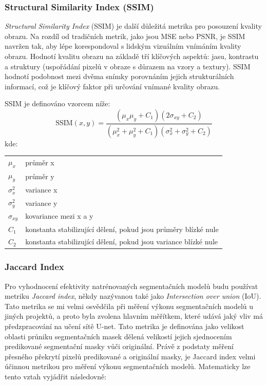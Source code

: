\documentclass[male,czech,api_ing]{thesis}
\makeatletter
\newenvironment{conditions}[1][kde:]
    {#1 \begin{tabular}[t]{>{$}l<{$} @{${}={}$} >{\raggedright\arraybackslash}p{10cm}}}
    {\end{tabular}}
\makeatother
\begin{document}
\subsubsection{Structural Similarity Index (SSIM)}
\textit{Structural Similarity Index} (SSIM) je další důležitá metrika pro posouzení kvality obrazu. Na rozdíl od tradičních metrik, jako jsou MSE nebo PSNR, je SSIM navržen tak, aby lépe korespondoval s lidským vizuálním vnímáním kvality obrazu. Hodnotí kvalitu obrazu na základě tří klíčových aspektů: jasu, kontrastu a struktury (uspořádání pixelů v obraze s důrazem na vzory a textury). SSIM hodnotí podobnost mezi dvěma snímky porovnáním jejich strukturálních informací, což je klíčový faktor při určování vnímané kvality obrazu. \cite{PSNRSSIM}

SSIM je definováno vzorcem níže:
\begin{equation}
    \text{SSIM}(x, y) = \frac{(\mu_x \mu_y + C_1)(2\sigma_{xy} + C_2)}{(\mu_x^2 + \mu_y^2 + C_1)(\sigma_x^2 + \sigma_y^2 + C_2)}
\end{equation}
\begin{conditions}
    \mu_x & průměr x \\
    \mu_y & průměr y \\
    \sigma_x^2 & variance x \\
    \sigma_y^2 & variance y \\
    \sigma_{xy} & kovariance mezi x a y \\
    C_1 & konstanta stabilizující dělení, pokud jsou průměry blízké nule \\
    C_2 & konstanta stabilizující dělení, pokud jsou variance blízké nule
\end{conditions}

\subsubsection{Jaccard Index}
Pro vyhodnocení efektivity natrénovaných segmentačních modelů budu používat metriku \textit{Jaccard index}, někdy nazývanou také jako \textit{Intersection over union} (IoU). Tato metrika se mi velmi osvědčila při měření výkonu segmentačních modelů u jiných projektů, a proto byla zvolena hlavním měřítkem, které udává jaký vliv má předzpracování na učení sítě U-net. Tato metrika je definována jako velikost oblasti průniku segmentačních masek dělená velikostí jejich sjednocením predikované segmentační masky vůči originální. Právě z podstaty měření přesného překrytí pixelů predikované a originální masky, je Jaccard index velmi účinnou metrikou pro měření výkonu segmentačních modelů. Matematicky lze tento vztah vyjádřit následovně:
\end{document}
